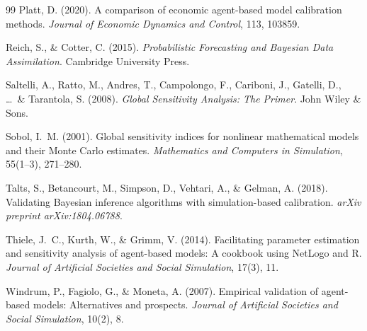 \documentclass[12pt]{article}
\begin{document}
\begin{thebibliography}{99}
Platt, D. (2020).
\newblock A comparison of economic agent-based model calibration methods.
\newblock \textit{Journal of Economic Dynamics and Control}, 113, 103859.

Reich, S., \& Cotter, C. (2015).
\newblock \textit{Probabilistic Forecasting and Bayesian Data Assimilation}.
\newblock Cambridge University Press.

Saltelli, A., Ratto, M., Andres, T., Campolongo, F., Cariboni, J., Gatelli, D., \ldots\ \& Tarantola, S. (2008).
\newblock \textit{Global Sensitivity Analysis: The Primer}.
\newblock John Wiley \& Sons.

Sobol, I.~M. (2001).
\newblock Global sensitivity indices for nonlinear mathematical models and their Monte Carlo estimates.
\newblock \textit{Mathematics and Computers in Simulation}, 55(1--3), 271--280.

Talts, S., Betancourt, M., Simpson, D., Vehtari, A., \& Gelman, A. (2018).
\newblock Validating Bayesian inference algorithms with simulation-based calibration.
\newblock \textit{arXiv preprint arXiv:1804.06788}.

Thiele, J.~C., Kurth, W., \& Grimm, V. (2014).
\newblock Facilitating parameter estimation and sensitivity analysis of agent-based models: A cookbook using NetLogo and R.
\newblock \textit{Journal of Artificial Societies and Social Simulation}, 17(3), 11.

Windrum, P., Fagiolo, G., \& Moneta, A. (2007).
\newblock Empirical validation of agent-based models: Alternatives and prospects.
\newblock \textit{Journal of Artificial Societies and Social Simulation}, 10(2), 8.

\end{thebibliography}
\end{document}
